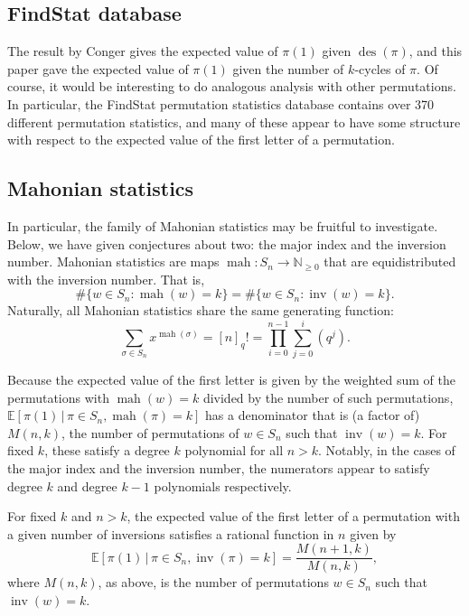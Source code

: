 \subsection{FindStat database}
The result by Conger gives the expected value of $\pi(1)$ given
$\operatorname{des}(\pi)$, and this paper gave the expected value of
$\pi(1)$ given the number of $k$-cycles of $\pi$. Of course, it would be
interesting to do analogous analysis with other permutations. In particular,
the FindStat permutation statistics database \cite{FindStat} contains over
370 different permutation statistics, and many of these appear to have some
structure with respect to the expected value of the first letter of a
permutation.

\subsection{Mahonian statistics}
In particular, the family of Mahonian statistics may be fruitful to investigate.
Below, we have given conjectures about two: the major index and the inversion number.
Mahonian statistics are maps
$\operatorname{mah} \colon S_n \rightarrow \mathbb{N}_{\geq0}$ that are
equidistributed with the inversion number.\cite{Foata} That is, \[
  \#\{w \in S_n : \operatorname{mah}(w) = k\} =
  \#\{w \in S_n : \operatorname{inv}(w) = k\}.
\]
Naturally, all Mahonian statistics share the same generating function: \[
  \sum_{\sigma \in S_n} x^{\operatorname{mah}(\sigma)}
    = [n]_q!
    = \prod_{i=0}^{n-1}\sum_{j=0}^i(q^j).
\]

Because the expected value of the first letter is given by the weighted sum of
the permutations with $\operatorname{mah}(w) = k$ divided by the number of such
permutations, $\mathbb{E}[\pi(1)\, |\, \pi \in S_n, \operatorname{mah}(\pi) = k]$
has a denominator that is (a factor of) $M(n,k)$, the number of permutations
of $w \in S_n$ such that $\operatorname{inv}(w) = k$. For fixed $k$, these
satisfy a degree $k$ polynomial for all $n > k$. Notably, in the cases of
the major index and the inversion number, the numerators appear to satisfy
degree $k$ and degree $k-1$ polynomials respectively.

\begin{conjecture}
  For fixed $k$ and $n > k$, the expected value of the first letter of a
  permutation with a given number of inversions satisfies a rational function
  in $n$ given by \[
    \mathbb{E}[\pi(1)\, |\, \pi \in S_n, \operatorname{inv}(\pi) = k]
    = \frac{M(n+1,k)}{M(n,k)},
  \] where $M(n,k)$, as above, is the number of permutations $w \in S_n$ such
  that $\operatorname{inv}(w) = k$.
\end{conjecture}

